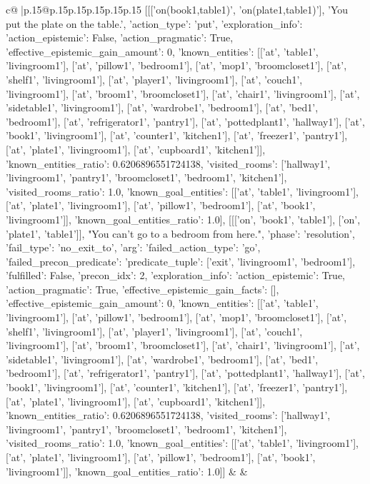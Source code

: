 \documentclass{article}
\begin{document}
{\begin{supertabular}{c@{$\;$}|p{.15\linewidth}@{}p{.15\linewidth}p{.15\linewidth}p{.15\linewidth}p{.15\linewidth}p{.15\linewidth}}
{{{	 [[['on(book1,table1)', 'on(plate1,table1)'], 'You put the plate on the table.', {'action_type': 'put', 'exploration_info': {'action_epistemic': False, 'action_pragmatic': True, 'effective_epistemic_gain_amount': 0, 'known_entities': [['at', 'table1', 'livingroom1'], ['at', 'pillow1', 'bedroom1'], ['at', 'mop1', 'broomcloset1'], ['at', 'shelf1', 'livingroom1'], ['at', 'player1', 'livingroom1'], ['at', 'couch1', 'livingroom1'], ['at', 'broom1', 'broomcloset1'], ['at', 'chair1', 'livingroom1'], ['at', 'sidetable1', 'livingroom1'], ['at', 'wardrobe1', 'bedroom1'], ['at', 'bed1', 'bedroom1'], ['at', 'refrigerator1', 'pantry1'], ['at', 'pottedplant1', 'hallway1'], ['at', 'book1', 'livingroom1'], ['at', 'counter1', 'kitchen1'], ['at', 'freezer1', 'pantry1'], ['at', 'plate1', 'livingroom1'], ['at', 'cupboard1', 'kitchen1']], 'known_entities_ratio': 0.6206896551724138, 'visited_rooms': ['hallway1', 'livingroom1', 'pantry1', 'broomcloset1', 'bedroom1', 'kitchen1'], 'visited_rooms_ratio': 1.0, 'known_goal_entities': [['at', 'table1', 'livingroom1'], ['at', 'plate1', 'livingroom1'], ['at', 'pillow1', 'bedroom1'], ['at', 'book1', 'livingroom1']], 'known_goal_entities_ratio': 1.0}}], [[['on', 'book1', 'table1'], ['on', 'plate1', 'table1']], "You can't go to a bedroom from here.", {'phase': 'resolution', 'fail_type': 'no_exit_to', 'arg': {'failed_action_type': 'go', 'failed_precon_predicate': {'predicate_tuple': ['exit', 'livingroom1', 'bedroom1'], 'fulfilled': False, 'precon_idx': 2}}, 'exploration_info': {'action_epistemic': True, 'action_pragmatic': True, 'effective_epistemic_gain_facts': [], 'effective_epistemic_gain_amount': 0, 'known_entities': [['at', 'table1', 'livingroom1'], ['at', 'pillow1', 'bedroom1'], ['at', 'mop1', 'broomcloset1'], ['at', 'shelf1', 'livingroom1'], ['at', 'player1', 'livingroom1'], ['at', 'couch1', 'livingroom1'], ['at', 'broom1', 'broomcloset1'], ['at', 'chair1', 'livingroom1'], ['at', 'sidetable1', 'livingroom1'], ['at', 'wardrobe1', 'bedroom1'], ['at', 'bed1', 'bedroom1'], ['at', 'refrigerator1', 'pantry1'], ['at', 'pottedplant1', 'hallway1'], ['at', 'book1', 'livingroom1'], ['at', 'counter1', 'kitchen1'], ['at', 'freezer1', 'pantry1'], ['at', 'plate1', 'livingroom1'], ['at', 'cupboard1', 'kitchen1']], 'known_entities_ratio': 0.6206896551724138, 'visited_rooms': ['hallway1', 'livingroom1', 'pantry1', 'broomcloset1', 'bedroom1', 'kitchen1'], 'visited_rooms_ratio': 1.0, 'known_goal_entities': [['at', 'table1', 'livingroom1'], ['at', 'plate1', 'livingroom1'], ['at', 'pillow1', 'bedroom1'], ['at', 'book1', 'livingroom1']], 'known_goal_entities_ratio': 1.0}}]] 
	  } 
	   } 
	   } 
	 & & \\ 
 


\end{supertabular}}
\end{document}
